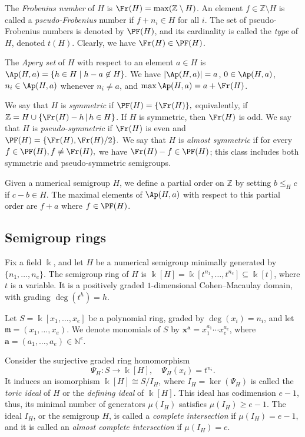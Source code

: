 \documentclass[11pt,twoside]{amsart}
\newcommand{\Z}{\mathbb Z}
\newcommand{\N}{\mathbb N}
\def\mm{\mathfrak m}
\def\ba{{\mathbf a}}
\def\bx{{\mathbf x}}
\theoremstyle{definition}
\numberwithin{equation}{section}
\begin{document}
The {\em Frobenius number} of $H$ is $\Fr(H) = \max ( \Z \setminus H)$.
An element $f\in \Z\setminus H$ is called a  {\em pseudo-Frobenius} number
if $f+n_i\in H$ for all $i$.
The set of  pseudo-Frobenius numbers is  denoted by $\PF(H)$,
and its cardinality is called the {\em type} of $H$, denoted $t(H)$. 
Clearly, we have $\Fr(H) \in \PF(H)$.


The {\em Apery set} of $H$ with respect to an element $a\in H$ is
$\Ap(H,a) = \{ h\in H\;|\; h-a \not\in H\}.$
We have
$|\Ap(H,a)|=a$,  $0 \in \Ap(H,a)$, $n_i\in\Ap(H,a)$ whenever $n_i \ne a$,
and $\max\Ap(H,a) = a + \Fr(H)$.


We say that $H$ is {\em symmetric} if $\PF(H)=\{\Fr(H)\},$
equivalently, 
if
$ \Z = H \cup  \{  \Fr(H) -h \,|\,  h\in H\}$. 
If $H$ is symmetric, then $\Fr(H)$ is odd.
We say that  $H$ is {\em pseudo-symmetric} if $\Fr(H)$ is even and 
$\PF(H)=\{\Fr(H),  \Fr(H)/2 \}.$
We say that  $H$ is {\em almost symmetric} if for every $f \in \PF(H), f \ne \Fr(H),$ we have $\Fr(H)-f \in \PF(H)$;
this class includes both symmetric and pseudo-symmetric semigroups.


Given a numerical semigroup $H$, we define a partial order on $\Z$ by setting 
$b \leq_H c$ if  $c-b \in H$.
The maximal elements of $\Ap( H,a)$ with respect to this partial order are $f+a$ where $f \in\PF(H)$.


\subsection{Semigroup rings}
Fix a field $\Bbbk$,
and let $H$ 
be a numerical semigroup minimally generated by $\{n_1, \ldots, n_e\}$.
The semigroup ring of $H$ is $\Bbbk[H] = \Bbbk[t^{n_1},\ldots,t^{n_e}]\subseteq \Bbbk[t]$,
where $t$ is a variable.
It is a positively graded  $1$-dimensional Cohen--Macaulay domain,
with grading $\deg(t^h) = h$.


Let $S = \Bbbk[x_1, \ldots, x_e]$ be a polynomial ring, 
 graded by $\deg(x_i) = n_i$, and let $\mm = (x_1, \ldots, x_e)$. 
 We denote monomials of $S$ by 
$\bx^\ba = x_1^{a_1}\cdots x_e^{a_e}$, where $\ba = (a_1, \ldots, a_e) \in \N^e.
$

Consider the surjective graded ring homomorphism
$$
\Psi_H : S \to \Bbbk[H], \quad \Psi_H(x_i) = t^{n_i}.
$$
It induces an isomorphism $\Bbbk[H] \cong S/I_H$,
where $I_H= \ker(\Psi_H)$ is called the {\em toric ideal} of $H$ or the  {\em defining ideal} of $\Bbbk[H]$.
This ideal has codimension $e-1$, thus, its minimal number of generators $\mu(I_H)$
satisfies $\mu(I_H) \geq e-1$.
The ideal $I_H$, or the semigroup $H$,
is called a \emph{complete intersection} if $\mu(I_H)=e-1$,
and it is called an \emph{almost complete intersection} if $\mu(I_H)= e$.
\end{document}
